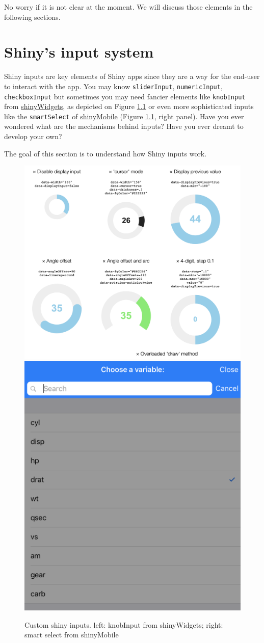 \documentclass[
]{book}
\begin{document}
No worry if it is not clear at the moment. We will discuss those elements in the following sections.

\hypertarget{shiny-input-system}{%
\chapter{Shiny's input system}\label{shiny-input-system}}

Shiny inputs are key elements of Shiny apps since they are a way for the end-user to interact with the app. You may know \texttt{sliderInput}, \texttt{numericInput}, \texttt{checkboxInput} but sometimes you may need fancier elements like \texttt{knobInput} from \href{https://github.com/dreamRs/shinyWidgets/blob/master/R/input-knob.R}{shinyWidgets}, as depicted on Figure \ref{fig:fancy-inputs} or even more sophisticated inputs like the \texttt{smartSelect} of \href{https://github.com/RinteRface/shinyMobile/blob/master/R/f7-inputs.R}{shinyMobile} (Figure \ref{fig:fancy-inputs}, right panel). Have you ever wondered what are the mechanisms behind inputs? Have you ever dreamt to develop your own?

The goal of this section is to understand how Shiny inputs work.

\begin{figure}
\includegraphics[width=0.5\linewidth]{images/survival-kit/jquery-knobs} \includegraphics[width=0.5\linewidth]{images/survival-kit/smart-select} \caption{Custom shiny inputs. left: knobInput from shinyWidgets; right: smart select from shinyMobile}\label{fig:fancy-inputs}
\end{figure}
\end{document}
